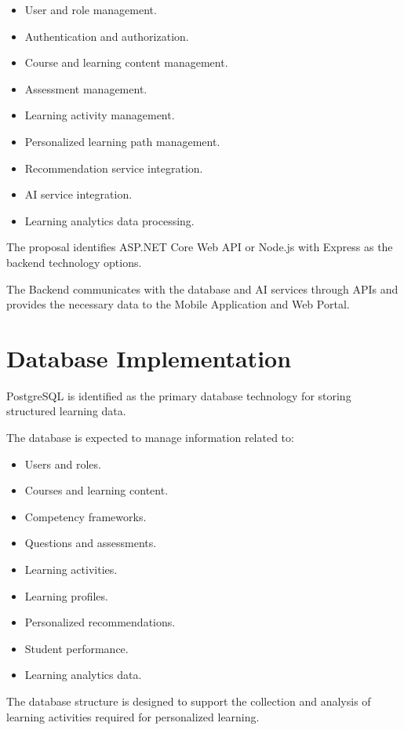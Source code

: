 \begin{itemize}
	\item User and role management.
	\item Authentication and authorization.
	\item Course and learning content management.
	\item Assessment management.
	\item Learning activity management.
	\item Personalized learning path management.
	\item Recommendation service integration.
	\item AI service integration.
	\item Learning analytics data processing.
\end{itemize}

The proposal identifies ASP.NET Core Web API or Node.js with Express as the backend technology options.

The Backend communicates with the database and AI services through APIs and provides the necessary data to the Mobile Application and Web Portal.

\section{Database Implementation}

PostgreSQL is identified as the primary database technology for storing structured learning data.

The database is expected to manage information related to:

\begin{itemize}
	\item Users and roles.
	\item Courses and learning content.
	\item Competency frameworks.
	\item Questions and assessments.
	\item Learning activities.
	\item Learning profiles.
	\item Personalized recommendations.
	\item Student performance.
	\item Learning analytics data.
\end{itemize}

The database structure is designed to support the collection and analysis of learning activities required for personalized learning.

